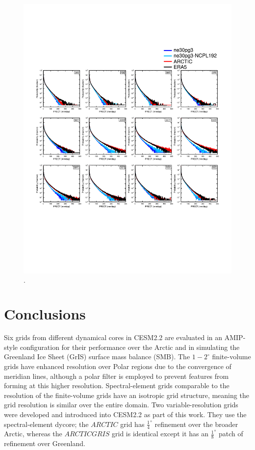 \documentclass[draft]{agujournal2019}
\begin{document}
\begin{figure}[t]
\begin{center}
         \includegraphics[width=130mm]{figs/temp_composite_ge45N_pdf.pdf}
\end{center}
\caption{.}
\label{fig:comp-pdf}
\end{figure}

\section{Conclusions}\label{sec:conclusions}

Six grids from different dynamical cores in CESM2.2 are evaluated in an AMIP-style configuration for their performance over the Arctic and in simulating the Greenland Ice Sheet (GrIS) surface mass balance (SMB). The $1-2^{\circ}$ finite-volume grids have enhanced resolution over Polar regions due to the convergence of meridian lines, although a polar filter is employed to prevent features from forming at this higher resolution. Spectral-element grids comparable to the resolution of the finite-volume grids have an isotropic grid structure, meaning the grid resolution is similar over the entire domain. Two variable-resolution grids were developed and introduced into CESM2.2 as part of this work. They use the spectral-element dycore; the $ARCTIC$ grid has $\frac{1}{4}^{\circ}$ refinement over the broader Arctic, whereas the $ARCTICGRIS$ grid is identical except it has an $\frac{1}{8}^{\circ}$ patch of refinement over Greenland.
\end{document}
